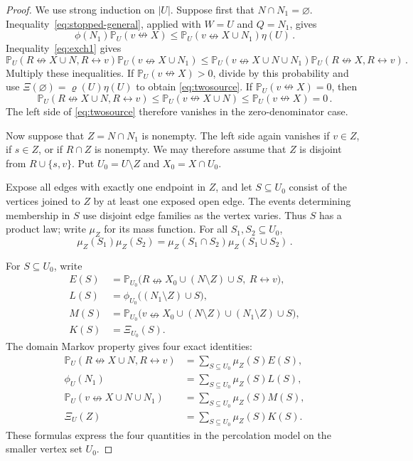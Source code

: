 \documentclass[11pt]{article}
\theoremstyle{definition}
\theoremstyle{remark}
\newcommand{\PP}{\mathbb P}
\newcommand{\con}{\leftrightarrow}
\newcommand{\ncon}{\nleftrightarrow}
\begin{document}
\begin{proof}
We use strong induction on $|U|$. Suppose first that $N\cap N_1=\varnothing$.
Inequality~\eqref{eq:stopped-general}, applied with $W=U$ and $Q=N_1$, gives
\[
 \phi(N_1)\PP_U(v\ncon X)
 \leq \PP_U(v\ncon X\cup N_1)\eta(U)\,.
\]
Inequality~\eqref{eq:exch1} gives
\[
 \PP_U(R\ncon X\cup N,R\con v)\PP_U(v\ncon X\cup N_1)
 \leq
 \PP_U(v\ncon X\cup N\cup N_1)\PP_U(R\ncon X,R\con v)\,.
\]
Multiply these inequalities. If $\PP_U(v\ncon X)>0$, divide by this probability and use
$\Xi(\varnothing)=\varrho(U)\eta(U)$ to obtain \eqref{eq:twosource}. If
$\PP_U(v\ncon X)=0$, then
\[
 \PP_U(R\ncon X\cup N,R\con v)
 \leq \PP_U(v\ncon X\cup N)
 \leq \PP_U(v\ncon X)=0\,.
\]
The left side of \eqref{eq:twosource} therefore vanishes in the zero-denominator case.

Now suppose that $Z=N\cap N_1$ is nonempty. The left side again vanishes if $v\in Z$, if
$s\in Z$, or if $R\cap Z$ is nonempty. We may therefore assume that $Z$ is disjoint from
$R\cup\{s,v\}$. Put $U_0=U\setminus Z$ and $X_0=X\cap U_0$.

Expose all edges with exactly one endpoint in $Z$, and let $S\subseteq U_0$ consist of the
vertices joined to $Z$ by at least one exposed open edge. The events determining
membership in $S$ use disjoint edge families as the vertex varies. Thus $S$ has a product law; write
$\mu_Z$ for its mass function. For all $S_1,S_2\subseteq U_0$,
\begin{equation}\label{eq:product-neighbour-law}
 \mu_Z(S_1)\mu_Z(S_2)
 =\mu_Z(S_1\cap S_2)\mu_Z(S_1\cup S_2)\,.
\end{equation}

For $S\subseteq U_0$, write
\[
 \begin{aligned}
 E(S)&=\PP_{U_0}\bigl(R\ncon X_0\cup(N\setminus Z)\cup S,\ R\con v\bigr),\\
 L(S)&=\phi_{U_0}\bigl((N_1\setminus Z)\cup S\bigr),\\
 M(S)&=\PP_{U_0}\bigl(v\ncon
       X_0\cup(N\setminus Z)\cup(N_1\setminus Z)\cup S\bigr),\\
 K(S)&=\Xi_{U_0}(S).
 \end{aligned}
\]
The domain Markov property gives four exact identities:
\[
 \begin{aligned}
 \PP_U(R\ncon X\cup N,R\con v)&=\sum_{S\subseteq U_0}\mu_Z(S)E(S),\\
 \phi_U(N_1)&=\sum_{S\subseteq U_0}\mu_Z(S)L(S),\\
 \PP_U(v\ncon X\cup N\cup N_1)&=\sum_{S\subseteq U_0}\mu_Z(S)M(S),\\
 \Xi_U(Z)&=\sum_{S\subseteq U_0}\mu_Z(S)K(S).
 \end{aligned}
\]
These formulas express the four quantities in the percolation model on the smaller vertex
set $U_0$.


\end{proof}
\end{document}
